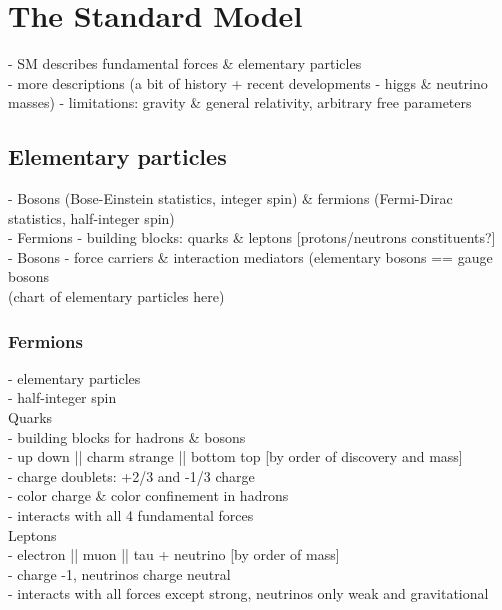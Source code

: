 \documentclass[../thesis.tex]{subfiles}
\begin{document}
\vspace{-1\baselineskip}

\section{The Standard Model}
\label{sec:SM}
- SM describes fundamental forces \& elementary particles\\
- more descriptions (a bit of history + recent developments - higgs \& neutrino masses)
- limitations: gravity \& general relativity, arbitrary free parameters

\subsection{Elementary particles}
- Bosons (Bose-Einstein statistics, integer spin) \& fermions (Fermi-Dirac statistics, half-integer spin)\\
- Fermions - building blocks: quarks \& leptons [protons/neutrons constituents?]\\
- Bosons - force carriers \& interaction mediators (elementary bosons == gauge bosons\\
(chart of elementary particles here)

\subsubsection*{Fermions}
- elementary particles \\
- half-integer spin \\
Quarks\\
- building blocks for hadrons \& bosons\\
- up down || charm strange || bottom top [by order of discovery and mass]\\
- charge doublets: +2/3 and -1/3 charge\\
- color charge \& color confinement in hadrons\\
- interacts with all 4 fundamental forces \\
Leptons\\
- electron || muon || tau + neutrino [by order of mass]\\
- charge -1, neutrinos charge neutral\\
- interacts with all forces except strong, neutrinos only weak and gravitational
\end{document}
